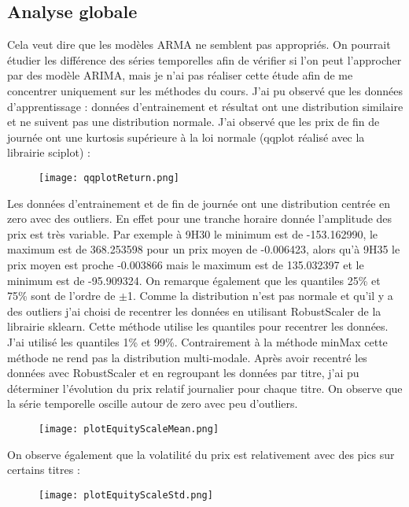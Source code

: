 \documentclass[12pt]{scrartcl} %
\begin{document}
\subsection{Analyse globale}
Cela veut dire que les modèles ARMA ne semblent pas appropriés. On pourrait étudier les différence des séries temporelles afin de vérifier si l'on peut l'approcher par des modèle ARIMA, mais je n'ai pas réaliser cette étude afin de me concentrer uniquement sur les méthodes du cours.
J'ai pu observé que les données d'apprentissage : données d'entrainement et résultat ont une distribution similaire et ne suivent pas une distribution normale. J'ai observé que les prix de fin de journée ont une kurtosis supérieure à la loi normale (qqplot réalisé avec la librairie sciplot) : 
\newline
\begin{figure}[!h]
 \centering 
\texttt{[image: qqplotReturn.png]}
\end{figure}
\newline
Les données d'entrainement et de fin de journée ont une distribution centrée en zero avec des outliers.  En effet pour une tranche horaire donnée l'amplitude des prix est très variable. Par exemple à 9H30 le minimum est de -153.162990, le maximum est de 368.253598 pour un prix moyen de -0.006423, alors qu'à 9H35 le prix moyen est proche -0.003866 mais le maximum est de 135.032397 et le minimum est de -95.909324. On remarque également que les quantiles 25\% et 75\% sont de l'ordre de $\pm$1. Comme la distribution n'est pas normale et qu'il y a des outliers j'ai choisi de recentrer les données en utilisant RobustScaler de la librairie sklearn. Cette méthode utilise les quantiles pour recentrer les données. J'ai utilisé les quantiles 1\% et 99\%. Contrairement à la méthode minMax cette méthode ne rend pas la distribution multi-modale.
Après avoir recentré les données avec RobustScaler et en regroupant les données par titre, j'ai pu déterminer l'évolution du prix relatif journalier pour chaque titre. On observe que la série temporelle oscille autour de zero avec peu d'outliers.
\begin{figure}[!h]
 \centering 
\texttt{[image: plotEquityScaleMean.png]}
\end{figure}
\newline
On observe également que la volatilité du prix est relativement avec des pics sur certains titres : 
\newline
\begin{figure}[!h]
\centering
\texttt{[image: plotEquityScaleStd.png]}
\end{figure}
\end{document}
